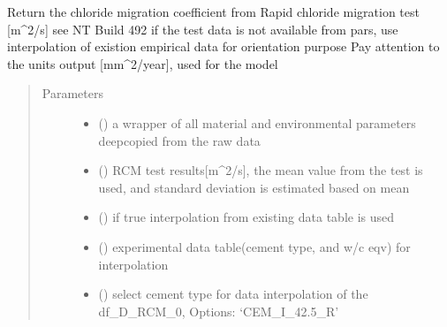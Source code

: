 \documentclass[letterpaper,10pt,english]{sphinxmanual}
\begin{document}
\begin{fulllineitems}
\label{\detokenize{chloride:chloride.D_RCM_0}}
\sphinxAtStartPar
Return the chloride migration coefficient from Rapid chloride migration test {[}m\textasciicircum{}2/s{]} see NT Build 492
if the test data is not available from pars, use interpolation of existion empirical data for orientation purpose
Pay attention to the units output {[}mm\textasciicircum{}2/year{]}, used for the model
\begin{quote}\begin{description}
\item[{Parameters}] \leavevmode\begin{itemize}
\item {} 
\sphinxAtStartPar
{} () \textendash{} a wrapper of all material and environmental parameters deep\sphinxhyphen{}copied from the raw data

\item {} 
\sphinxAtStartPar
{} () \textendash{} RCM test results{[}m\textasciicircum{}2/s{]}, the mean value from the test is used, and standard deviation is estimated based on mean

\item {} 
\sphinxAtStartPar
{} () \textendash{} if true interpolation from existing data table is used

\item {} 
\sphinxAtStartPar
{} () \textendash{} experimental data table(cement type, and w/c eqv) for interpolation

\item {} 
\sphinxAtStartPar
{} () \textendash{} 
\sphinxAtStartPar
select cement type for data interpolation of the df\_D\_RCM\_0,
Options:
‘CEM\_I\_42.5\_R’


\end{itemize}
\end{description}
\end{quote}
\end{fulllineitems}
\end{document}
